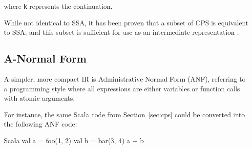 \noindent where \texttt{k} represents the continuation.

While not identical to SSA, it has been proven that a subset of CPS is equivalent to SSA, and this
subset is sufficient for use as an intermediate representation \autocite{kelsey1993correspondence}.

\subsection{A-Normal Form}

A simpler, more compact IR is Administrative Normal Form (ANF), referring to a programming style
where all expressions are either variables or function calls with atomic arguments.

For instance, the same Scala code from Section~\ref{sec:cps} could be converted into the following
ANF code:

\begin{code}{Scala}
    val a = foo(1, 2)
    val b = bar(3, 4)
    a + b
\end{code}
